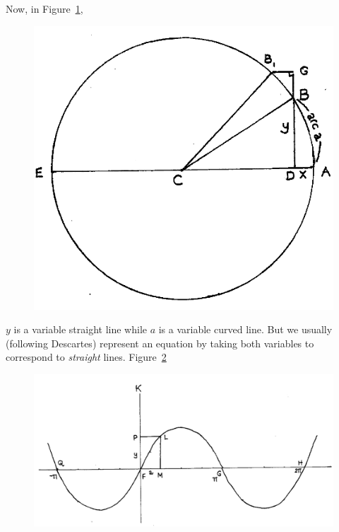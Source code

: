 \documentclass[twoside,openright]{article}
\begin{document}
Now, in Figure~\ref{circarc2},
\addtocounter{figure}{-1}
\begin{figure}[htp]
\begin{center}
\includegraphics[width=.65\textwidth]{fig/Figure42}
\caption{}
\label{circarc2}
\vspace{-10pt}
\end{center}
\end{figure} 
 $y$ is a variable straight line while $a$ is a variable curved line.  But we usually (following Descartes) represent an equation by taking both variables to correspond to {\em straight} lines.  Figure~\ref{sinecurve}
\begin{figure}[htp]
\begin{center}
\includegraphics[width=\textwidth]{fig/Figure48}
\caption{}
\label{sinecurve}
\vspace{-10pt}
\end{center}
\end{figure} 
\end{document}
